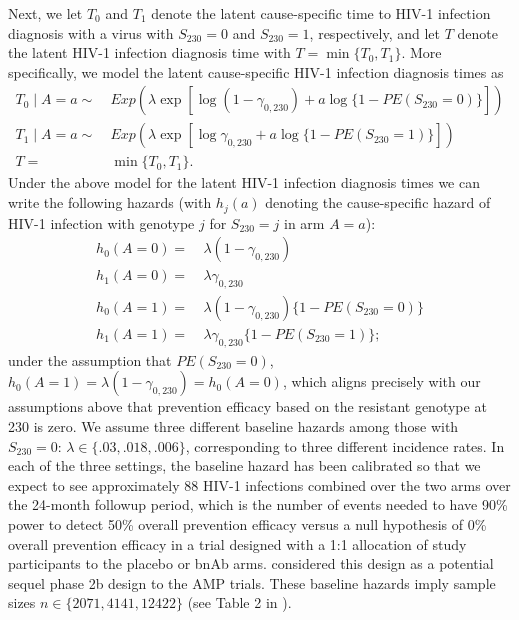 \documentclass[10pt]{article}
\begin{document}
Next, we let $T_0$ and $T_1$ denote the latent cause-specific time to HIV-1 infection diagnosis with a virus with $S_{230} = 0$ and $S_{230} = 1$, respectively, and let $T$ denote the latent HIV-1 infection diagnosis time with $T = \min \{T_0, T_1\}$. More specifically, we model the latent cause-specific HIV-1 infection diagnosis times as
\begin{align*}
  T_0 \mid A = a \sim & \ Exp(\lambda \exp[\log (1 - \gamma_{0, 230}) + a \log\{1 - PE(S_{230} = 0)\}]) \\
  T_1 \mid A = a \sim & \ Exp(\lambda\exp[\log \gamma_{0,230} + a \log\{1 - PE(S_{230} = 1)\}]) \\
  T =& \ \min\{T_0, T_1\}.
\end{align*}
Under the above model for the latent HIV-1 infection diagnosis times we can write the following hazards (with $h_j(a)$ denoting the cause-specific hazard of HIV-1 infection with genotype $j$ for $S_{230} = j$ in arm $A = a$):
\begin{align*}
  h_0(A = 0) =& \ \lambda (1 - \gamma_{0, 230}) \\
  h_1(A = 0) =& \ \lambda \gamma_{0,230} \\
  h_0(A = 1) =& \ \lambda (1 - \gamma_{0, 230}) \{1 - PE(S_{230} = 0)\} \\
  h_1(A = 1) =& \ \lambda \gamma_{0,230} \{1 - PE(S_{230} = 1)\};
\end{align*}
under the assumption that $PE(S_{230} = 0)$, $h_0(A = 1) = \lambda (1 - \gamma_{0, 230}) = h_0(A = 0)$, which aligns precisely with our assumptions above that prevention efficacy based on the resistant genotype at 230 is zero. We assume three different baseline hazards among those with $S_{230} = 0$: $\lambda \in \{.03, .018, .006\}$, corresponding to three different incidence rates. In each of the three settings, the baseline hazard has been calibrated so that we expect to see approximately 88 HIV-1 infections combined over the two arms over the 24-month followup period, which is the number of events needed to have 90\% power to detect 50\% overall prevention efficacy versus a null hypothesis of 0\% overall prevention efficacy in a trial designed with a 1:1 allocation of study participants to the placebo or bnAb arms.  \citet{gilbert2019} considered this design as a potential sequel phase 2b design to the AMP trials. These baseline hazards imply sample sizes $n \in \{2071, 4141, 12422\}$ (see Table 2 in \citet{gilbert2019}).
\end{document}
